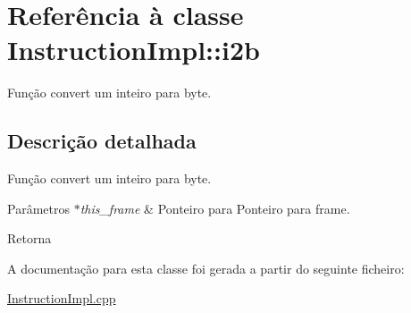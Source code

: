 \hypertarget{class_instruction_impl_1_1i2b}{}\section{Referência à classe Instruction\+Impl\+:\+:i2b}
\label{class_instruction_impl_1_1i2b}


Função convert um inteiro para byte.  




\subsection{Descrição detalhada}
Função convert um inteiro para byte. 


\begin{DoxyParams}{Parâmetros}
{\em $\ast$this\+\_\+frame} & Ponteiro para Ponteiro para frame. \\
\hline
\end{DoxyParams}
\begin{DoxyReturn}{Retorna}

\end{DoxyReturn}


A documentação para esta classe foi gerada a partir do seguinte ficheiro\+:\begin{DoxyCompactItemize}
\item 
\hyperlink{_instruction_impl_8cpp}{Instruction\+Impl.\+cpp}\end{DoxyCompactItemize}
